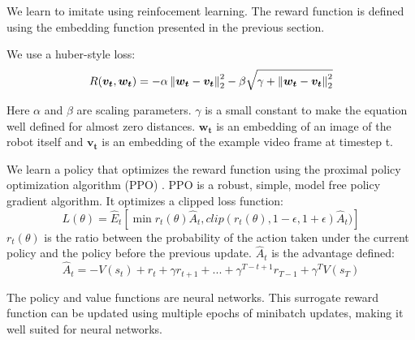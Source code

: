 We learn to imitate using reinfocement learning. The reward function is defined using the embedding function presented in the previous section.

We use a huber-style loss: \[
    R(\boldsymbol{v_t}, \boldsymbol{w_t}) = -\alpha \left\lVert\boldsymbol{w_t} - \boldsymbol{v_t}\right\rVert^2_2 -\beta \sqrt{\gamma + \left\lVert\boldsymbol{w_t} - \boldsymbol{v_t}\right\rVert^2_2}
\]

Here $\alpha$ and $\beta$ are scaling parameters. $\gamma$ is a small constant to make the equation well defined for almost zero distances. $\boldsymbol{w_t}$ is an embedding of an image of the robot itself and $\boldsymbol{v_t}$ is an embedding of the example video frame at timestep t.

We learn a policy that optimizes the reward function using the proximal policy optimization algorithm (PPO) \citep{ppo}. PPO is a robust, simple, model free policy gradient algorithm. It optimizes a clipped loss function: \[
    L(\theta) = \hat{E}_t[\min{r_t(\theta)\hat{A}_t, clip(r_t(\theta), 1 - \epsilon, 1 + \epsilon)\hat{A}_t})]
\]
$r_t(\theta)$ is the ratio between the probability of the action taken under the current policy and the policy before the previous update. $\hat{A}_t$ is the advantage defined: \[
    \hat{A}_t = -V(s_t) + r_t + \gamma r_{t+1} + ... + \gamma^{T-t+1}r_{T-1} + \gamma^T V(s_T)
    \]

The policy and value functions are neural networks. This surrogate reward function can be updated using multiple epochs of minibatch updates, making it well suited for neural networks. \citep{ppo}


